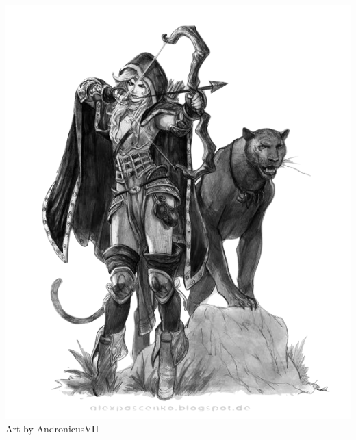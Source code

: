 \begin{multicols*}{2}
\begin{Figure}
\centering
\includegraphics[width=\textwidth]{img/hunter-panther.png}
{\scriptsize Art by AndronicusVII} 

\end{Figure}
    
\end{multicols*}    